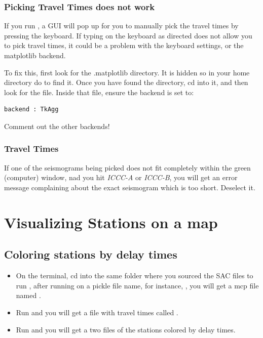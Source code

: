 \documentclass[letterpaper,10pt,english]{sphinxmanual}
\begin{document}
\subsection{Picking Travel Times does not work}
\label{docfiles/PickingTravelTimes:picking-travel-times-does-not-work}
If you run , a GUI will pop up for you to manually pick the travel times by pressing the keyboard. If typing on the keyboard as directed does not allow you to pick travel times, it could be a problem with the keyboard settings, or the matplotlib backend.

To fix this, first look for the .matplotlib directory. It is hidden so in your home directory do  to find it.
Once you have found the  directory, cd into it, and then look for the  file.
Inside that file, ensure the backend is set to:

\begin{Verbatim}[commandchars=\\\{\}]
backend : TkAgg
\end{Verbatim}

Comment out the other backends!


\subsection{Travel Times}
\label{docfiles/PickingTravelTimes:travel-times}
If one of the seismograms being picked does not fit completely within the green (computer) window, nad you hit \emph{ICCC-A} or \emph{ICCC-B}, you will get an error message complaining about the exact seismogram which is too short. Deselect it.


\chapter{Visualizing Stations on a map}
\label{docfiles/VisualizingStations:visualizing-stations-on-a-map}\label{docfiles/VisualizingStations::doc}

\section{Coloring stations by delay times}
\label{docfiles/VisualizingStations:coloring-stations-by-delay-times}\begin{itemize}
\item {} 
On the terminal, cd into the same folder where you sourced the SAC files to run , after running  on a pickle file name, for instance, , you will get a mcp file named .

\item {} 
Run  and you will get a file with travel times called .

\item {} 
Run  and you will get a two  files of the stations colored by delay times.

\end{itemize}
\end{document}
